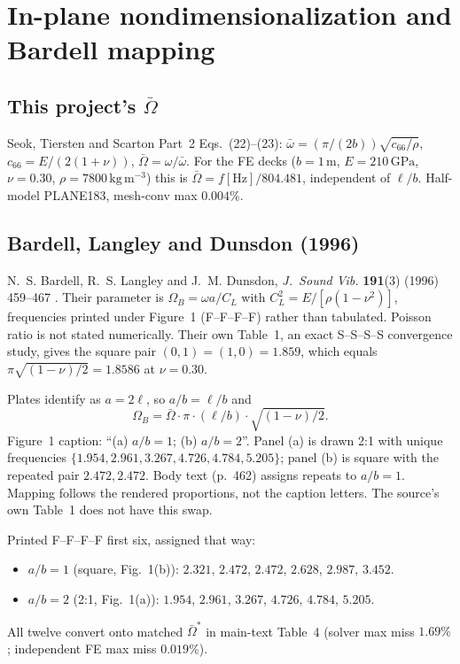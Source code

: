 \documentclass[11pt]{article}
\begin{document}
\section{In-plane nondimensionalization and Bardell mapping}\label{sec:sm-ip}

\subsection{This project's
\texorpdfstring{$\bar\Omega$}{Omega-bar}}\label{sec:sm-ombar}
Seok, Tiersten and Scarton Part~2 Eqs.~(22)--(23):
$\bar\omega=(\pi/(2b))\sqrt{c_{66}/\rho}$, $c_{66}=E/(2(1+\nu))$,
$\bar\Omega=\omega/\bar\omega$. For the FE decks ($b=1\,\mathrm{m}$,
$E=210\,\mathrm{GPa}$, $\nu=0.30$, $\rho=7800\,\mathrm{kg\,m^{-3}}$)
this is $\bar\Omega=f[\mathrm{Hz}]/804.481$, independent of $\ell/b$.
Half-model PLANE183, mesh-conv max $0.004\%$.

\subsection{Bardell, Langley and Dunsdon (1996)}\label{sec:sm-bardell}
N.~S. Bardell, R.~S. Langley and J.~M. Dunsdon, \emph{J.\ Sound Vib.}
\textbf{191}(3) (1996) 459--467 \cite{bardell1996}. Their parameter is
$\Omega_B=\omega a/C_L$ with $C_L^2=E/[\rho(1-\nu^2)]$, frequencies
printed under Figure~1 (F--F--F--F) rather than tabulated. Poisson ratio
is not stated numerically. Their own Table~1, an exact S--S--S--S
convergence study, gives the square pair $(0,1)=(1,0)=1.859$, which equals
$\pi\sqrt{(1-\nu)/2}=1.8586$ at $\nu=0.30$.

Plates identify as $a=2\ell$, so $a/b=\ell/b$ and
\begin{equation}
\Omega_B=\bar\Omega\cdot\pi\cdot(\ell/b)\cdot\sqrt{(1-\nu)/2}.
\label{eq:sm-bardell}
\end{equation}
Figure~1 caption: ``(a) $a/b=1$; (b) $a/b=2$''. Panel (a) is drawn 2:1
with unique frequencies $\{1.954, 2.961, 3.267, 4.726, 4.784, 5.205\}$;
panel (b) is square with the repeated pair $2.472,2.472$. Body text
(p.~462) assigns repeats to $a/b=1$. Mapping follows the rendered
proportions, not the caption letters. The source's own Table~1 does not
have this swap.

Printed F--F--F--F first six, assigned that way:
\begin{itemize}\itemsep2pt
\item $a/b=1$ (square, Fig.~1(b)): $2.321$, $2.472$, $2.472$, $2.628$,
$2.987$, $3.452$.
\item $a/b=2$ (2:1, Fig.~1(a)): $1.954$, $2.961$, $3.267$, $4.726$,
$4.784$, $5.205$.
\end{itemize}
All twelve convert onto matched $\bar\Omega^{*}$ in main-text Table~4
(solver max miss $1.69\%$; independent FE max miss $0.019\%$).
\end{document}
